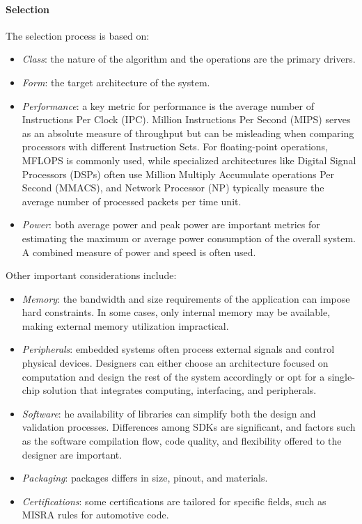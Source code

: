\paragraph*{Selection}
The selection process is based on: 
\begin{itemize}
    \item \textit{Class}: the nature of the algorithm and the operations are the primary drivers.
    \item \textit{Form}: the target architecture of the system. 
    \item \textit{Performance}: a key metric for performance is the average number of Instructions Per Clock (IPC). 
        Million Instructions Per Second (MIPS) serves as an absolute measure of throughput but can be misleading when comparing processors with different Instruction Sets.
        For floating-point operations, MFLOPS is commonly used, while specialized architectures like Digital Signal Processors (DSPs) often use Million Multiply Accumulate operations Per Second (MMACS), and Network Processor (NP) typically measure the average number of processed packets per time unit.
    \item \textit{Power}: both average power and peak power are important metrics for estimating the maximum or average power consumption of the overall system. 
        A combined measure of power and speed is often used.
\end{itemize}
Other important considerations include:
\begin{itemize}
    \item \textit{Memory}: the bandwidth and size requirements of the application can impose hard constraints. 
        In some cases, only internal memory may be available, making external memory utilization impractical. 
    \item \textit{Peripherals}: embedded systems often process external signals and control physical devices. 
        Designers can either choose an architecture focused on computation and design the rest of the system accordingly or opt for a single-chip solution that integrates computing, interfacing, and peripherals. 
    \item \textit{Software}: he availability of libraries can simplify both the design and validation processes. 
        Differences among SDKs are significant, and factors such as the software compilation flow, code quality, and flexibility offered to the designer are important. 
    \item \textit{Packaging}: packages differs in size, pinout, and materials.
    \item \textit{Certifications}: some certifications are tailored for specific fields, such as MISRA rules for automotive code. 
\end{itemize}

